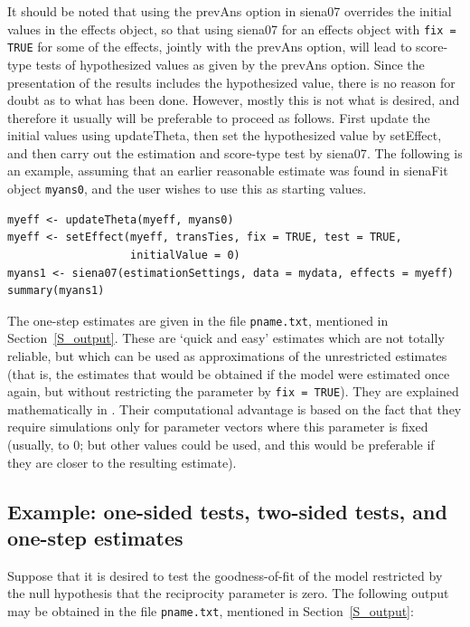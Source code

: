 \documentclass[a4paper,fleqn,11pt]{article}
\newcommand{\+}{\, + \,}
\newcommand{\sfn}[1]{\textsf{#1}}
\begin{document}
It should be noted that using the \sfn{prevAns} option in \textsf{siena07}
overrides the initial values in the effects object,
so that using \sfn{siena07} for an effects object with
\texttt{fix = TRUE} for some of the effects, jointly with
the \sfn{prevAns} option, will lead to score-type tests
of hypothesized values as given by the  \sfn{prevAns} option.
Since the presentation of the results includes the
hypothesized value, there is no reason for doubt as to what
has been done. However, mostly this is not what is desired,
and therefore it usually will be preferable to proceed as follows.
First update the initial values using \sfn{updateTheta}, then
set the hypothesized value by \sfn{setEffect}, and then
carry out the estimation and score-type test by \sfn{siena07}.
The following is an example, assuming that an earlier
reasonable estimate was found in \sfn{sienaFit} object \texttt{myans0},
and the user wishes to use this as starting values.
\begin{verbatim}
myeff <- updateTheta(myeff, myans0)
myeff <- setEffect(myeff, transTies, fix = TRUE, test = TRUE,
                   initialValue = 0)
myans1 <- siena07(estimationSettings, data = mydata, effects = myeff)
summary(myans1)
\end{verbatim}


The one-step estimates are given in the file \texttt{pname.txt},
mentioned in Section~\ref{S_output}.
These are `quick and easy' estimates which are not totally
reliable, but which can be used as approximations of the unrestricted estimates
(that is, the estimates that would be obtained if the model were estimated
once again, but without restricting the parameter by \texttt{fix = TRUE}).
They are explained mathematically in \citet{Schweinberger12}.
Their computational advantage is based on the fact that they require simulations
only for parameter vectors where this parameter is fixed (usually, to 0;
but other values could be used, and this would be preferable if they are closer
to the resulting estimate).

\subsection{Example: one-sided tests, two-sided tests, and one-step estimates}
\label{example}

Suppose that it is desired to test the goodness-of-fit of the model
restricted by the null hypothesis that the reciprocity parameter is zero.
The following output may be obtained in the file \texttt{pname.txt},
mentioned in Section~\ref{S_output}:
\end{document}
